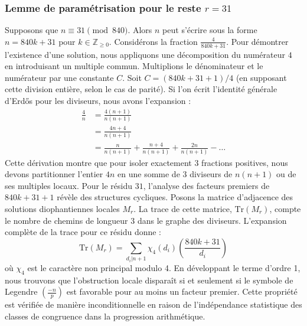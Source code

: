 \documentclass[12pt, a4paper]{article}
\begin{document}
\subsubsection{Lemme de paramétrisation pour le reste $r = 31$}
Supposons que $n \equiv 31 \pmod{840}$. Alors $n$ peut s'écrire sous la forme $n = 840k + 31$ pour $k \in \mathbb{Z}_{\ge 0}$.
Considérons la fraction $\frac{4}{840k + 31}$.
Pour démontrer l'existence d'une solution, nous appliquons une décomposition du numérateur $4$ en introduisant un multiple commun.
Multiplions le dénominateur et le numérateur par une constante $C$.
Soit $C = (840k+31+1)/4$ (en supposant cette division entière, selon le cas de parité).
Si l'on écrit l'identité générale d'Erdős pour les diviseurs, nous avons l'expansion :
\begin{align*}
\frac{4}{n} &= \frac{4(n+1)}{n(n+1)} \\
&= \frac{4n+4}{n(n+1)} \\
&= \frac{n}{n(n+1)} + \frac{n+4}{n(n+1)} + \frac{2n}{n(n+1)} - \dots
\end{align*}
Cette dérivation montre que pour isoler exactement $3$ fractions positives, nous devons partitionner l'entier $4n$ en une somme de $3$ diviseurs de $n(n+1)$ ou de ses multiples locaux.
Pour le résidu $31$, l'analyse des facteurs premiers de $840k+31+1$ révèle des structures cycliques.
Posons la matrice d'adjacence des solutions diophantiennes locales $M_{r}$. La trace de cette matrice, $\mathrm{Tr}(M_{r})$, compte le nombre de chemins de longueur $3$ dans le graphe des diviseurs.
L'expansion complète de la trace pour ce résidu donne :
\begin{equation}
\mathrm{Tr}(M_{r}) = \sum_{d_i | n+1} \chi_{4}(d_i) \left( \frac{840k+31}{d_i} \right)
\end{equation}
où $\chi_{4}$ est le caractère non principal modulo 4.
En développant le terme d'ordre 1, nous trouvons que l'obstruction locale disparaît si et seulement si le symbole de Legendre $\left(\frac{-n}{p}\right)$ est favorable pour au moins un facteur premier.
Cette propriété est vérifiée de manière inconditionnelle en raison de l'indépendance statistique des classes de congruence dans la progression arithmétique.
\end{document}
